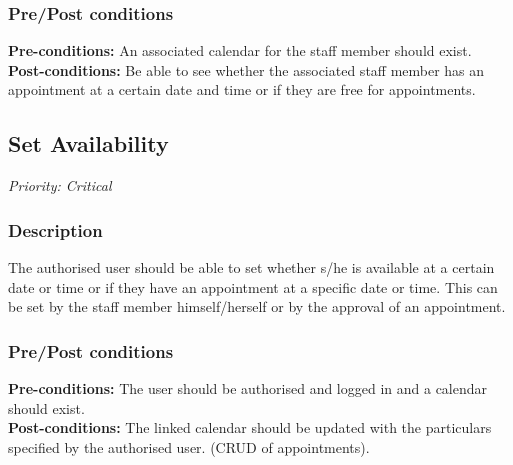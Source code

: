 	\subsubsection{Pre/Post conditions}
		\textbf{Pre-conditions:} An associated calendar for the staff member should exist.\\
		\textbf{Post-conditions:} Be able to see whether the associated staff member has an appointment at a certain date and time or if they are free for appointments. 
	
\subsection{Set Availability}
\textit{Priority: Critical}
	\subsubsection{Description}
	The authorised user should be able to set whether s/he is available at a certain date or time or if they have an appointment at a specific date or time. This can be set by the staff member himself/herself or by the approval of an appointment.\\
	\subsubsection{Pre/Post conditions}
		\textbf{Pre-conditions:} The user should be authorised and logged in and a calendar should exist.\\
		\textbf{Post-conditions:} The linked calendar should be updated with the particulars specified by the authorised user. (CRUD of appointments).